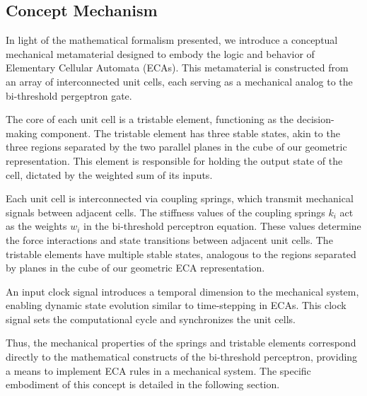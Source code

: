 \subsection*{Concept Mechanism}

In light of the mathematical formalism presented, we introduce a conceptual mechanical metamaterial designed to embody the logic and behavior of Elementary Cellular Automata (ECAs). This metamaterial is constructed from an array of interconnected unit cells, each serving as a mechanical analog to the bi-threshold pergeptron gate.

The core of each unit cell is a tristable element, functioning as the decision-making component. The tristable element has three stable states, akin to the three regions separated by the two parallel planes in the cube of our geometric representation. This element is responsible for holding the output state of the cell, dictated by the weighted sum of its inputs. 

Each unit cell is interconnected via coupling springs, which transmit mechanical signals between adjacent cells. The stiffness values of the coupling springs \(k_i\) act as the weights \( w_i \) in the bi-threshold perceptron equation. These values determine the force interactions and state transitions between adjacent unit cells. The tristable elements have multiple stable states, analogous to the regions separated by planes in the cube of our geometric ECA representation.

An input clock signal introduces a temporal dimension to the mechanical system, enabling dynamic state evolution similar to time-stepping in ECAs. This clock signal sets the computational cycle and synchronizes the unit cells.

Thus, the mechanical properties of the springs and tristable elements correspond directly to the mathematical constructs of the bi-threshold perceptron, providing a means to implement ECA rules in a mechanical system. The specific embodiment of this concept is detailed in the following section.

